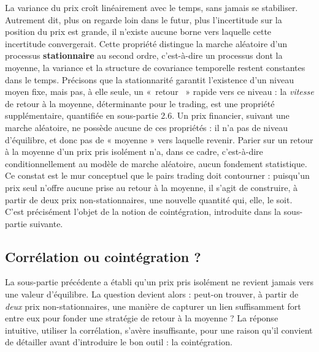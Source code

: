 \documentclass{article}
\providecommand{\og}{«~}
\providecommand{\fg}{~»}
\begin{document}
La variance du prix croît linéairement avec le temps, sans jamais se stabiliser. Autrement dit, plus on regarde loin dans le futur, plus l'incertitude sur la position du prix est grande, il n'existe aucune borne vers laquelle cette incertitude convergerait.
Cette propriété distingue la marche aléatoire d'un processus \textbf{stationnaire} au second ordre, c'est-à-dire un processus dont la moyenne, la variance et la structure de covariance temporelle restent constantes dans le temps. Précisons que la stationnarité garantit l'existence d'un niveau moyen fixe, mais pas, à elle seule, un \og retour \fg{} rapide vers ce niveau : la \emph{vitesse} de retour à la moyenne, déterminante pour le trading, est une propriété supplémentaire, quantifiée en sous-partie 2.6. Un prix financier, suivant une marche aléatoire, ne possède aucune de ces propriétés : il n'a pas de niveau d'équilibre, et donc pas de « moyenne » vers laquelle revenir. Parier sur un retour à la moyenne d'un prix pris isolément n'a, dans ce cadre, c'est-à-dire conditionnellement au modèle de marche aléatoire, aucun fondement statistique.
Ce constat est le mur conceptuel que le pairs trading doit contourner : puisqu'un prix seul n'offre aucune prise au retour à la moyenne, il s'agit de construire, à partir de deux prix non-stationnaires, une nouvelle quantité qui, elle, le soit. C'est précisément l'objet de la notion de cointégration, introduite dans la sous-partie suivante.
\subsection{Corrélation ou cointégration ?}
La sous-partie précédente a établi qu'un prix pris isolément ne revient jamais vers une valeur d'équilibre. La question devient alors : peut-on trouver, à partir de \emph{deux} prix non-stationnaires, une manière de capturer un lien suffisamment fort entre eux pour fonder une stratégie de retour à la moyenne ? La réponse intuitive, utiliser la corrélation, s'avère insuffisante, pour une raison qu'il convient de détailler avant d'introduire le bon outil : la cointégration.
\end{document}
